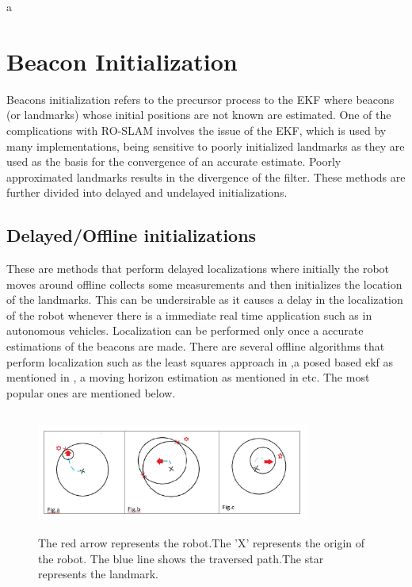 \documentclass[conference]{IEEEtran}
\begin{document}
	
	
	
	
	a%
	
	
	
	

	
	


	


\section{Beacon Initialization}
Beacons initialization refers to the precursor process to the EKF where beacons (or landmarks) whose initial positions are not known are estimated. One of the complications with RO-SLAM involves the issue of the EKF, which is used by many implementations, being  sensitive to poorly initialized landmarks as they are used as the basis for the convergence of an accurate estimate. Poorly approximated landmarks results in the divergence of the filter. These methods are further  divided into delayed and undelayed initializations.
\subsection{Delayed/Offline initializations}
These are methods that perform delayed localizations  where initially the robot moves around offline collects some measurements and then initializes the location of the landmarks. This can be undersirable as it causes a delay in the localization of the robot whenever there is a immediate real time application such as in autonomous vehicles. Localization can be performed only once a accurate estimations of the beacons are made. There are several offline algorithms that perform localization such as the least squares approach in \cite{Newman},a posed based ekf as mentioned in \cite{Webster} , a moving horizon estimation as mentioned in \cite{SenWang2013} etc. The most popular ones are mentioned below.

\begin{figure}
	\centering
	\includegraphics[height=40mm,width=90mm]{Trilateration_methods.JPG}
	\caption{The red arrow represents the robot.The 'X' represents the origin of the robot. The blue line shows the traversed path.The star represents the landmark. }
	
\end{figure}
\end{document}
